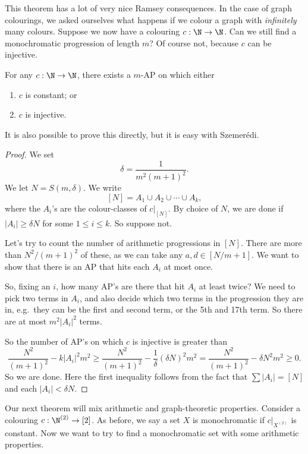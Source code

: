\documentclass[a4paper]{article}
\begin{document}
This theorem has a lot of very nice Ramsey consequences. In the case of graph colourings, we asked ourselves what happens if we colour a graph with \emph{infinitely} many colours. Suppose we now have a colouring $c: \N \to \N$. Can we still find a monochromatic progression of length $m$? Of course not, because $c$ can be injective.

\begin{thm}
  For any $c: \N \to \N$, there exists a $m$-AP on which either
  \begin{enumerate}
    \item $c$ is constant; or
    \item $c$ is injective.
  \end{enumerate}
\end{thm}
It is also possible to prove this directly, but it is easy with Szemer\'edi.

\begin{proof}
  We set
  \[
    \delta = \frac{1}{m^2(m + 1)^2}.
  \]
  We let $N = S(m, \delta)$. We write
  \[
    [N] = A_1 \cup A_2 \cup \cdots \cup A_k,
  \]
  where the $A_i$'s are the colour-classes of $c|_{[N]}$. By choice of $N$, we are done if $|A_i| \geq \delta N$ for some $1 \leq i \leq k$. So suppose not.

  Let's try to count the number of arithmetic progressions in $[N]$. There are more than $N^2/(m + 1)^2$ of these, as we can take any $a, d \in [N/m + 1]$. We want to show that there is an AP that hits each $A_i$ at most once.

  So, fixing an $i$, how many AP's are there that hit $A_i$ at least twice? We need to pick two terms in $A_i$, and also decide which two terms in the progression they are in, e.g.\ they can be the first and second term, or the 5th and 17th term. So there are at most $m^2 |A_i|^2$ terms.

  So the number of AP's on which $c$ is injective is greater than
  \[
    \frac{N^2}{(m + 1)^2} - k |A_i|^2 m^2 \geq \frac{N^2}{(m + 1)^2} - \frac{1}{\delta} (\delta N)^2 m^2 = \frac{N^2}{(m + 1)^2} - \delta N^2 m^2 \geq 0.
  \]
  So we are done. Here the first inequality follows from the fact that $\sum |A_i| = [N]$ and each $|A_i| < \delta N$.
\end{proof}

Our next theorem will mix arithmetic and graph-theoretic properties. Consider a colouring $c: \N^{(2)} \to [2]$. As before, we say a set $X$ is monochromatic if $c|_{X^{(2)}}$ is constant. Now we want to try to find a monochromatic set with some arithmetic properties.
\end{document}
